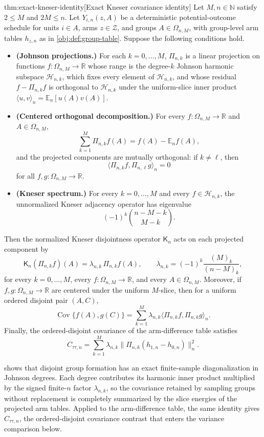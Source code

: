 \documentclass[11pt]{article}
\begin{document}
\begin{theoremv}{thm:exact-kneser-identity}[Exact Kneser covariance identity]
Let \(M,n\in\mathbb N\) satisfy \(2\le M\) and \(2M\le n\). Let \(Y_{i,n}(z,A)\) be a deterministic potential-outcome schedule for units \(i\in A\), arms \(z\in\mathcal Z\), and groups \(A\in\Omega_{n,M}\), with group-level arm tables \(h_{z,n}\) as in \cref{obj:def:group-table}. Suppose the following conditions hold.
\begin{itemize}
\item \textbf{(Johnson projections.)} For each \(k=0,\ldots,M\), \(\Pi_{n,k}\) is a linear projection on functions \(f:\Omega_{n,M}\to\mathbb R\) whose range is the degree-\(k\) Johnson harmonic subspace \(\mathcal H_{n,k}\), which fixes every element of \(\mathcal H_{n,k}\), and whose residual \(f-\Pi_{n,k}f\) is orthogonal to \(\mathcal H_{n,k}\) under the uniform-slice inner product \(\langle u,v\rangle_n=\mathbb E_n[u(A)v(A)]\).
\item \textbf{(Centered orthogonal decomposition.)} For every \(f:\Omega_{n,M}\to\mathbb R\) and \(A\in\Omega_{n,M}\),
\[
\sum_{k=1}^{M}\Pi_{n,k}f(A)=f(A)-\mathbb E_n f(A),
\]
and the projected components are mutually orthogonal: if \(k\ne \ell\), then
\[
\langle \Pi_{n,k}f,\Pi_{n,\ell}g\rangle_n=0
\]
for all \(f,g:\Omega_{n,M}\to\mathbb R\).
\item \textbf{(Kneser spectrum.)} For every \(k=0,\ldots,M\) and every \(f\in\mathcal H_{n,k}\), the unnormalized Kneser adjacency operator has eigenvalue
\[
(-1)^k {n-M-k\choose M-k}.
\]
\end{itemize}
Then the normalized Kneser disjointness operator \(\mathsf K_n\) acts on each projected component by
\[
\mathsf K_n(\Pi_{n,k}f)(A)=\lambda_{n,k}\,\Pi_{n,k}f(A),
\qquad
\lambda_{n,k}=(-1)^k\frac{(M)_k}{(n-M)_k},
\]
for every \(k=0,\ldots,M\), every \(f:\Omega_{n,M}\to\mathbb R\), and every \(A\in\Omega_{n,M}\). Moreover, if \(f,g:\Omega_{n,M}\to\mathbb R\) are centered under the uniform \(M\)-slice, then for a uniform ordered disjoint pair \((A,C)\),
\[
\operatorname{Cov}\{f(A),g(C)\}
=
\sum_{k=1}^{M}\lambda_{n,k}
\langle \Pi_{n,k}f,\Pi_{n,k}g\rangle_n .
\]
Finally, the ordered-disjoint covariance of the arm-difference table satisfies
\[
C_{\tau\tau,n}
=
\sum_{k=1}^{M}\lambda_{n,k}
\bigl\|\Pi_{n,k}(h_{1,n}-h_{0,n})\bigr\|_n^2 .
\]
\end{theoremv}

 shows that disjoint group formation has an exact finite-sample diagonalization in Johnson degrees. Each degree contributes its harmonic inner product multiplied by the signed finite-\(n\) factor \(\lambda_{n,k}\), so the covariance retained by sampling groups without replacement is completely summarized by the slice energies of the projected arm tables. Applied to the arm-difference table, the same identity gives \(C_{\tau\tau,n}\), the ordered-disjoint covariance contrast that enters the variance comparison below.
\end{document}
